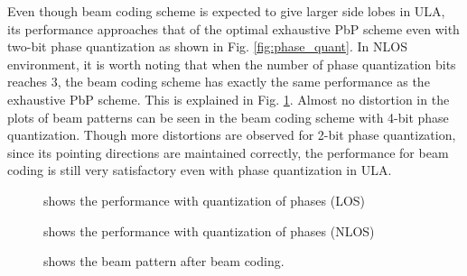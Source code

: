\documentclass[10pt,conference]{IEEEtran}
\begin{document}
Even though beam coding scheme is expected
to give larger side lobes in ULA, its performance approaches that of the optimal exhaustive PbP scheme even with two-bit phase quantization as shown in Fig. \ref{fig:phase_quant}. In NLOS environment, it is worth noting that when the number of phase quantization bits reaches 3, the beam coding scheme has exactly the same performance as the exhaustive PbP scheme. This is explained in Fig. \ref{fig:polar_plot_2}. Almost no distortion in the plots of beam patterns can be seen in the beam coding scheme with 4-bit phase quantization. Though more distortions are observed for 2-bit phase quantization, since its pointing directions are maintained correctly, the performance for beam coding is still very satisfactory even with phase quantization in ULA.
\begin{figure}
\centering
{}
\caption{shows the performance with quantization of phases (LOS)}
\label{fig:phase_quant}
\vspace{+15pt}
\centering
{}
\caption{shows the performance with quantization of phases (NLOS)}\label{fig:phase_quant_NLOS}
\vspace{+5pt}
\centering
 \caption{shows the beam pattern after beam coding.}\label{fig:polar_plot_2}
 \end{figure}
\end{document}
